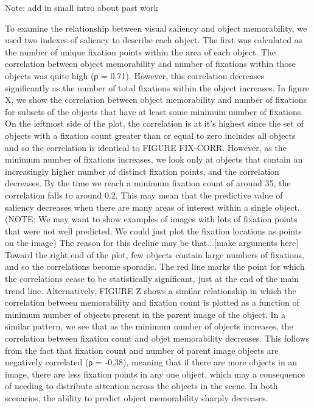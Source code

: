 Note: add in small intro about past work

To examine the relationship between visual saliency and object memorability, we used two indexes of saliency to describe each object. The first was calculated as the number of unique fixation points within the area of each object. The correlation between object memorability and number of fixations within those objects was quite high (ρ = 0.71). However, this correlation decreases significantly as the number of total fixations within the object increases. In figure X, we show the correlation between object memorability and number of fixations for subsets of the objects that have at least some minimum number of fixations. On the leftmost side of the plot, the correlation is at it's highest since the set of objects with a fixation count greater than or equal to zero includes all objects and so the correlation is identical to FIGURE FIX-CORR. However, as the minimum number of fixations increases, we look only at objects that contain an increasingly higher number of distinct fixation points, and the correlation decreases. By the time we reach a minimum fixation count of around 35, the correlation falls to around 0.2. This may mean that the predictive value of saliency decreases when there are many areas of interest within a single object. (NOTE: We may want to show examples of images with lots of fixation points that were not well predicted. We could just plot the fixation locations as points on the image) The reason for this decline may be that...[make arguments here] Toward the right end of the plot, few objects contain large numbers of fixations, and so the correlations become sporadic. The red line marks the point for which the correlations cease to be statistically significant, just at the end of the main trend line. Alternatively, FIGURE Z shows a similar relationship in which the correlation between memorability and fixation count is plotted as a function of minimum number of objects present in the parent image of the object. In a similar pattern, we see that as the minimum number of objects increases, the correlation between fixation count and objet memorability decreases. This follows from the fact that fixation count and number of parent image objects are negatively correlated (ρ = -0.38), meaning that if there are more objects in an image, there are less fixation points in any one object, which may a consequence of needing to distribute attention across the objects in the scene. In both scenarios, the ability to predict object memorability sharply decreases.

